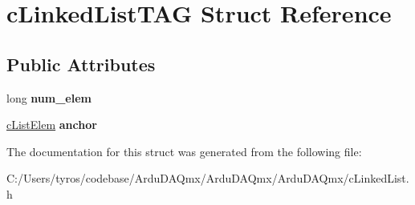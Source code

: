 \hypertarget{structc_linked_list_t_a_g}{}\section{c\+Linked\+List\+T\+AG Struct Reference}
\label{structc_linked_list_t_a_g}
\subsection*{Public Attributes}
\begin{DoxyCompactItemize}
\item 
\mbox{\label{structc_linked_list_t_a_g_a82fec83fe9a50a2b059d4f7323678547}} 
long {\bfseries num\+\_\+elem}
\item 
\mbox{\label{structc_linked_list_t_a_g_a100db7b17bf5691f6b812d87b3826f1e}} 
\mbox{\hyperlink{structc_list_elem_t_a_g}{c\+List\+Elem}} {\bfseries anchor}
\end{DoxyCompactItemize}


The documentation for this struct was generated from the following file\+:\begin{DoxyCompactItemize}
\item 
C\+:/\+Users/tyros/codebase/\+Ardu\+D\+A\+Qmx/\+Ardu\+D\+A\+Qmx/\+Ardu\+D\+A\+Qmx/c\+Linked\+List.\+h\end{DoxyCompactItemize}
